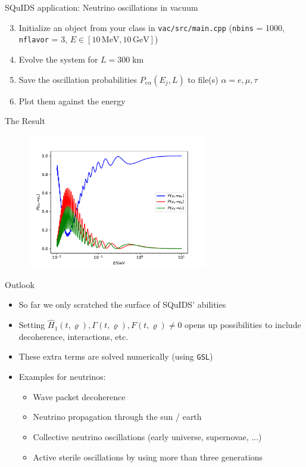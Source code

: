 \documentclass[]{beamer}
\begin{document}
\begin{frame}{SQuIDS application: Neutrino oscillations in vacuum}
  \begin{enumerate}
    \setcounter{enumi}{2}
    \item Initialize an object from your class in \texttt{vac/src/main.cpp} (\texttt{nbins} = 1000, \texttt{nflavor} = 3, \(E \in [10 \,\mathrm{MeV}, 10 \,\mathrm{GeV}]\))
    \item Evolve the system for \(L = 300 \; \mathrm{km}\)
    \item Save the oscillation probabilities \(P_{e\alpha}(E_j, L)\) to file(s) \(\alpha = e, \mu, \tau\)
    \item Plot them against the energy
  \end{enumerate}
\end{frame}

\begin{frame}{The Result}
  \begin{figure}
    \centering
    \includegraphics[width=0.7\textwidth]{figs/probs.pdf}
  \end{figure}
\end{frame}

\begin{frame}{Outlook}
  \begin{itemize}
    \item So far we only scratched the surface of SQuIDS' abilities
    \item Setting \(\hat{H}_1(t, \varrho), \Gamma(t, \varrho), F(t, \varrho) \neq 0\) opens up possibilities to include decoherence, interactions, etc.
    \item These extra terms are solved numerically (using \texttt{GSL})
    \item Examples for neutrinos:
    \begin{itemize}
      \item Wave packet decoherence 
      \item Neutrino propagation through the sun / earth 
      \item Collective neutrino oscillations (early universe, supernovae, ...)
      \item Active sterile oscillations by using more than three generations
    \end{itemize}
  \end{itemize}
\end{frame}
\end{document}
